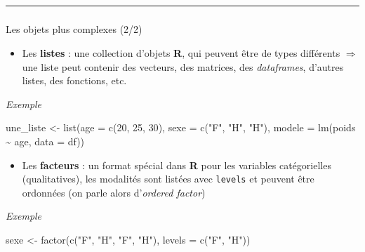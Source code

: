 \documentclass[
  french,
  10pt,
  a4paper,
]{article}
\makeatletter
\let\oldsubparagraph\subparagraph
\renewcommand{\subparagraph}{
    \@ifstar
      \xxxSubParagraphStar
      \xxxSubParagraphNoStar
  }
\newcommand{\xxxSubParagraphStar}[1]{\oldsubparagraph*{#1}\mbox{}}
\newcommand{\xxxSubParagraphNoStar}[1]{\oldsubparagraph{#1}\mbox{}}
\newenvironment{Shaded}{}{}
\newcommand{\AttributeTok}[1]{\textcolor[rgb]{0.65,0.15,0.64}{#1}}
\newcommand{\DecValTok}[1]{\textcolor[rgb]{0.60,0.41,0.00}{#1}}
\newcommand{\FunctionTok}[1]{\textcolor[rgb]{0.25,0.47,0.95}{#1}}
\newcommand{\NormalTok}[1]{\textcolor[rgb]{0.22,0.23,0.26}{#1}}
\newcommand{\OtherTok}[1]{\textcolor[rgb]{0.15,0.68,0.38}{#1}}
\newcommand{\SpecialCharTok}[1]{\textcolor[rgb]{0.00,0.52,0.74}{#1}}
\newcommand{\StringTok}[1]{\textcolor[rgb]{0.31,0.63,0.31}{#1}}
\providecommand{\tightlist}{%
  \setlength{\itemsep}{0pt}\setlength{\parskip}{0pt}}
\makeatother
\begin{document}
\begin{center}\rule{0.5\linewidth}{0.5pt}\end{center}

\subparagraph{Les objets plus complexes
(2/2)}\label{les-objets-plus-complexes-22}

\begin{itemize}
\tightlist
\item
  Les \textbf{listes} : une collection d'objets \textbf{R}, qui peuvent
  être de types différents \(\Rightarrow\) une liste peut contenir des
  vecteurs, des matrices, des \emph{dataframes}, d'autres listes, des
  fonctions, etc.
\end{itemize}

\emph{Exemple}

\begin{Shaded}
\begin{Highlighting}[]
\NormalTok{une\_liste }\OtherTok{\textless{}{-}} \FunctionTok{list}\NormalTok{(}\AttributeTok{age =} \FunctionTok{c}\NormalTok{(}\DecValTok{20}\NormalTok{, }\DecValTok{25}\NormalTok{, }\DecValTok{30}\NormalTok{),}
                  \AttributeTok{sexe =} \FunctionTok{c}\NormalTok{(}\StringTok{"F"}\NormalTok{, }\StringTok{"H"}\NormalTok{, }\StringTok{"H"}\NormalTok{),}
                  \AttributeTok{modele =} \FunctionTok{lm}\NormalTok{(poids }\SpecialCharTok{\textasciitilde{}}\NormalTok{ age, }\AttributeTok{data =}\NormalTok{ df))}
\end{Highlighting}
\end{Shaded}

\begin{itemize}
\tightlist
\item
  Les \textbf{facteurs} : un format spécial dans \textbf{R} pour les
  variables catégorielles (qualitatives), les modalités sont listées
  avec \texttt{levels} et peuvent être ordonnées (on parle alors
  d'\emph{ordered factor})
\end{itemize}

\emph{Exemple}

\begin{Shaded}
\begin{Highlighting}[]
\NormalTok{sexe }\OtherTok{\textless{}{-}} \FunctionTok{factor}\NormalTok{(}\FunctionTok{c}\NormalTok{(}\StringTok{"F"}\NormalTok{, }\StringTok{"H"}\NormalTok{, }\StringTok{"F"}\NormalTok{, }\StringTok{"H"}\NormalTok{), }
               \AttributeTok{levels =} \FunctionTok{c}\NormalTok{(}\StringTok{"F"}\NormalTok{, }\StringTok{"H"}\NormalTok{))}
\end{Highlighting}
\end{Shaded}
\end{document}
